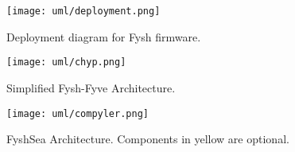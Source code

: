 \begin{figure}[h]
	\centering
	\texttt{[image: uml/deployment.png]}
	\caption{Deployment diagram for Fysh firmware.}
	\label{fig:deployment}
\end{figure}

\begin{figure}[h]
	\centering
	\texttt{[image: uml/chyp.png]}
	\caption{Simplified Fysh-Fyve Architecture.}
	\label{fig:component}
\end{figure}

\begin{figure}[h]
	\centering
	\texttt{[image: uml/compyler.png]}
	\caption{FyshSea Architecture. Components in yellow are optional.}
	\label{fig:component}
\end{figure}

